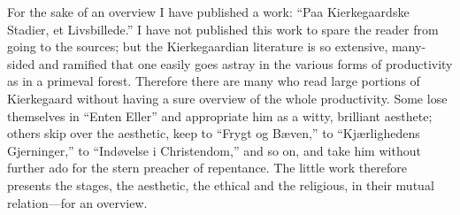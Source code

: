 \documentclass[12pt]{book}
\begin{document}
For the sake of an overview I have published a work: ``Paa
Kierkegaardske Stadier, et Livsbillede.'' I have not published this work
to spare the reader from going to the sources; but the Kierkegaardian
literature is so extensive, many-sided and ramified that one easily goes
astray in the various forms of productivity as in a primeval forest.
Therefore there are many who read large portions of Kierkegaard without
having a sure overview of the whole productivity. Some lose themselves
in ``Enten Eller'' and appropriate him as a witty, brilliant aesthete;
others skip over the aesthetic, keep to ``Frygt og Bæven,'' to
``Kjærlighedens Gjerninger,'' to ``Indøvelse i Christendom,'' and so on,
and take him without further ado for the stern preacher of repentance.
The little work therefore presents the stages, the aesthetic, the
ethical and the religious, in their mutual relation---for an overview.
\end{document}
